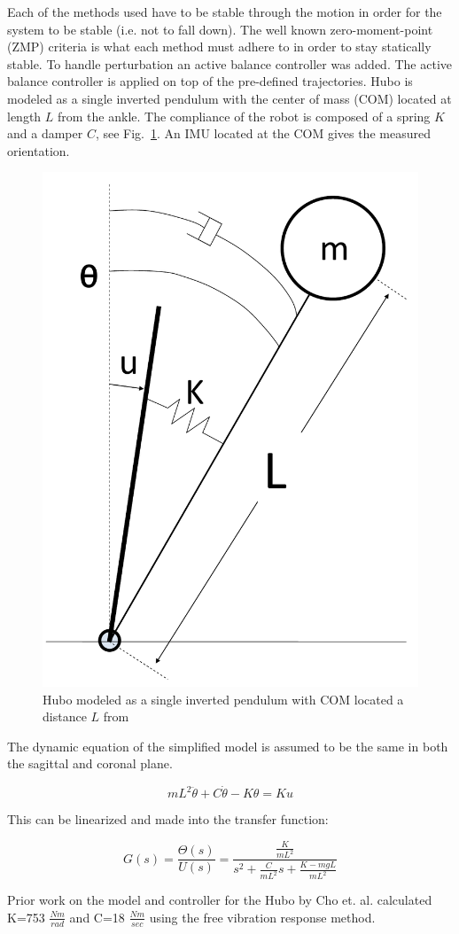 Each of the methods used have to be stable through the motion in order for the system to be stable (i.e. not to fall down).  
The well known zero-moment-point (ZMP) criteria is what each method must adhere to in order to stay statically stable\cite{Vukobratovic19721}.  
To handle perturbation an active balance controller was added.  
The active balance controller is applied on top of the pre-defined trajectories.  
Hubo is modeled as a single inverted pendulum with the center of mass (COM) located at length $L$ from the ankle.  
The compliance of the robot is composed of a spring $K$ and a damper $C$, see Fig.~\ref{fig:invPen}.  
An IMU located at the COM gives the measured orientation.

\begin{figure}[t]
  \centering
\includegraphics[width=0.4\columnwidth]{./pix/invPen3.pdf}
  \caption{Hubo modeled as a single inverted pendulum with COM located a distance $L$ from }
  \label{fig:invPen}
\end{figure}

The dynamic equation of the simplified model is assumed to be the same in both the sagittal and coronal plane.

\begin{equation}
mL^2\ddot{\theta}+C\dot{\theta}-K\theta = Ku
\end{equation}

This can be linearized and made into the transfer function:

\begin{equation}
G(s) = \frac{\Theta(s)}{U(s)} = \frac{\frac{K}{mL^2}}{s^2+\frac{C}{mL^2}s + \frac{K-mgL}{mL^2}}
\end{equation}

Prior work on the model and controller for the Hubo by Cho et. al. calculated K=753 $\frac{Nm}{rad}$ and C=18 $\frac{Nm}{sec}$ using the free vibration response method\cite{5379574}.


